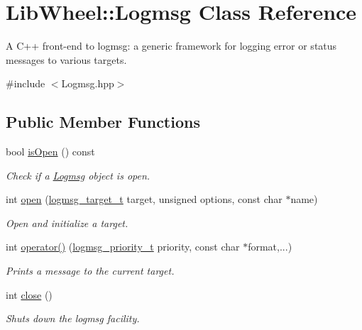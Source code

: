 \hypertarget{classLibWheel_1_1Logmsg}{
\section{\-Lib\-Wheel\-:\-:\-Logmsg \-Class \-Reference}
\label{classLibWheel_1_1Logmsg}
}


\-A \-C++ front-\/end to logmsg\-: a generic framework for logging error or status messages to various targets.  




{\ttfamily \#include $<$\-Logmsg.\-hpp$>$}

\subsection*{\-Public \-Member \-Functions}
\begin{DoxyCompactItemize}
\item 
bool \hyperlink{classLibWheel_1_1Logmsg_ab778652185e2ed865ac2e351e1a01e64}{is\-Open} () const 
\begin{DoxyCompactList}\small\item\em \-Check if a \hyperlink{classLibWheel_1_1Logmsg}{\-Logmsg} object is open. \end{DoxyCompactList}\item 
int \hyperlink{classLibWheel_1_1Logmsg_a02f8204ca716a58419ad10cd0f53fcb9}{open} (\hyperlink{logmsg_8h_a79de13cee8c9b70b7851d97b86d4bbe5}{logmsg\-\_\-target\-\_\-t} target, unsigned options, const char $\ast$name)
\begin{DoxyCompactList}\small\item\em \-Open and initialize a target. \end{DoxyCompactList}\item 
int \hyperlink{classLibWheel_1_1Logmsg_a52ab6f44c7b2d4b033341005289cdaca}{operator()} (\hyperlink{logmsg_8h_a0b3d82d29e7bdec3d6961f3475f4f7f6}{logmsg\-\_\-priority\-\_\-t} priority, const char $\ast$format,...)
\begin{DoxyCompactList}\small\item\em \-Prints a message to the current target. \end{DoxyCompactList}\item 
int \hyperlink{classLibWheel_1_1Logmsg_a051fe5f24cf626a08e72f47eeca16c0a}{close} ()
\begin{DoxyCompactList}\small\item\em \-Shuts down the logmsg facility. \end{DoxyCompactList}\end{DoxyCompactItemize}
